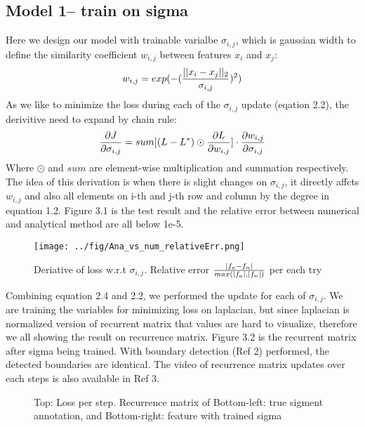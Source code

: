 \documentclass[final]{siamltexmm}
\begin{document}
\subsection{Model 1-- train on sigma}
Here we design our model with trainable varialbe $\sigma_{i,j}$, which is gaussian width to define the similarity coefficient $w_{i,j}$ between features $x_i$ and $x_j$:
\begin{equation}
w_{i,j} = exp(- ({|| x_i - x_j ||_2 \over \sigma_{i,j} })^2)
\end{equation}
As we like to minimize the loss during each of the $\sigma_{i,j}$ update (eqation 2.2), the derivitive need to expand by chain rule:
\begin{equation}
{\partial J \over \partial \sigma_{i,j}} = sum[(L - L^{\ast}) \odot {\partial L \over \partial w_{i,j}}] \cdot {\partial w_{i,j} \over \partial \sigma_{i,j}}
\end{equation}
Where $\odot$ and $sum$ are element-wise multiplication and summation respectively. The idea of this derivation is when there is slight changes on $\sigma_{i,j}$, it directly affcts $w_{i,j}$ and also all elements on i-th and j-th row and column by the degree in equation 1.2. Figure 3.1 is the test result and the relative error between numerical and analytical method are all below 1e-5.
\begin{figure}[H]
  \centering
    \texttt{[image: ../fig/Ana\_vs\_num\_relativeErr.png]}
  \caption{Deriative of loss w.r.t $\sigma_{i,j}$. Relative error $|f_a - f_n| \over max(|f_a|, |f_n|)$ per each try}
\end{figure}
Combining equation 2.4 and 2.2, we performed the update for each of $\sigma_{i,j}$. We are training the variables for minimizing loss on laplacian, but since laplacian is normalized version of recurrent matrix that values are hard to visualize, therefore we all showing the result on recurrence matrix. Figure 3.2 is the recurrent matrix after sigma being trained. With boundary detection (Ref 2) performed, the detected boundaries are identical. The video of recurrence matrix updates over each steps is also available in Ref 3.
\begin{figure}[H]
\centering

\caption{Top: Loss per step. Recurrence matrix of Bottom-left: true sigment annotation, and Bottom-right: feature with trained sigma }
\end{figure}
\end{document}
